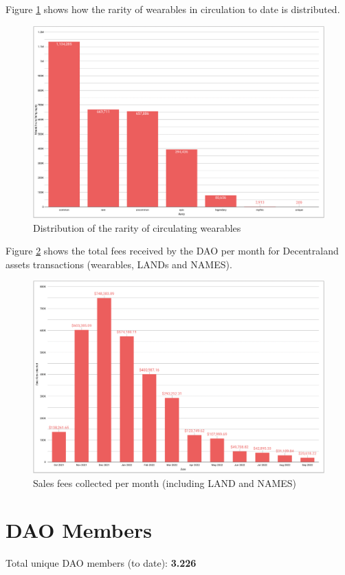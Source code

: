 \documentclass[MSE,Master,english]{twbook}%
\begin{document}
Figure \ref{fig:rarity_distribution} shows how the rarity of wearables in circulation to date is distributed.
\begin{figure}[H]
  \centering
  \includegraphics[width=\textwidth]{metrics/rarity_distribution.png}
  \caption{Distribution of the rarity of circulating wearables}
  \label{fig:rarity_distribution}
\end{figure}

Figure \ref{fig:sales_fees} shows the total fees received by the DAO per month for Decentraland assets transactions (wearables, LANDs and NAMES).
\begin{figure}[H]
  \centering
  \includegraphics[width=\textwidth]{metrics/sales_fees.png}
  \caption{Sales fees collected per month (including LAND and NAMES)}
  \label{fig:sales_fees}
\end{figure}

\section{DAO Members}
Total unique DAO members (to date): \textbf{3.226} \\
\end{document}
